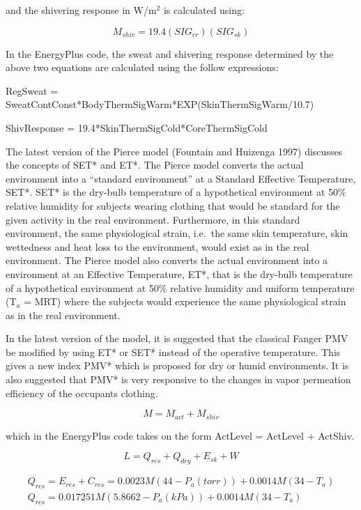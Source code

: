 and the shivering response in W/m\(^{2}\) is calculated using:

\begin{equation}
{M_{shiv}} = 19.4(SI{G_{cr}})(SI{G_{sk}})
\end{equation}

In the EnergyPlus code, the sweat and shivering response determined by the above two equations are calculated using the follow expressions:

RegSweat = SweatContConst*BodyThermSigWarm*EXP(SkinThermSigWarm/10.7)

ShivResponse = 19.4*SkinThermSigCold*CoreThermSigCold

The latest version of the Pierce model (Fountain and Huizenga 1997) discusses the concepts of SET* and ET*. The Pierce model converts the actual environment into a ``standard environment'' at a Standard Effective Temperature, SET*. SET* is the dry-bulb temperature of a hypothetical environment at 50\% relative humidity for subjects wearing clothing that would be standard for the given activity in the real environment. Furthermore, in this standard environment, the same physiological strain, i.e.~the same skin temperature, skin wettedness and heat loss to the environment, would exist as in the real environment. The Pierce model also converts the actual environment into a environment at an Effective Temperature, ET*, that is the dry-bulb temperature of a hypothetical environment at 50\% relative humidity and uniform temperature (T\(_a\) = MRT) where the subjects would experience the same physiological strain as in the real environment.

In the latest version of the model, it is suggested that the classical Fanger PMV be modified by using ET* or SET* instead of the operative temperature. This gives a new index PMV* which is proposed for dry or humid environments. It is also suggested that PMV* is very responsive to the changes in vapor permeation efficiency of the occupants clothing.

\begin{equation}
M = {M_{act}} + {M_{shiv}}
\end{equation}

which in the EnergyPlus code takes on the form ActLevel = ActLevel + ActShiv.

\begin{equation}
L = {Q_{res}} + {Q_{dry}} + {E_{sk}} + W
\end{equation}

\begin{equation}
\begin{array}{l}{Q_{res}} = {E_{res}} + {C_{res}} = 0.0023M(44 - {P_{a}(torr)}) + 0.0014M(34 - {T_a})\\{Q_{res}} = 0.017251M(5.8662 - {P_{a}(kPa)}) + 0.0014M(34 - {T_a})\end{array}
\end{equation}

